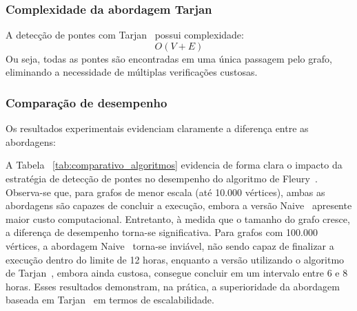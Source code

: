 \documentclass{sbc2023}%
\begin{document}
\subsubsection{Complexidade da abordagem Tarjan}

A detecção de pontes com Tarjan~\cite{tarjan1972dfs} possui complexidade:
$$O(V + E)$$
Ou seja, todas as pontes são encontradas em uma única passagem pelo grafo, eliminando a necessidade de múltiplas verificações custosas.

\subsubsection{Comparação de desempenho}

Os resultados experimentais evidenciam claramente a diferença entre as abordagens:

\begin{table}[H] %
\centering
\caption{Comparativo de Desempenho: Fleury Naive vs. Fleury + Tarjan}
\label{tab:comparativo_algoritmos}
\end{table}

A Tabela ~\ref{tab:comparativo_algoritmos} evidencia de forma clara o impacto da estratégia de detecção de pontes no desempenho do algoritmo de Fleury~\citep{AlgoFleury}. Observa-se que, para grafos de menor escala (até 10.000 vértices), ambas as abordagens são capazes de concluir a execução, embora a versão Naive~\cite{cormen2022Naive} apresente maior custo computacional. Entretanto, à medida que o tamanho do grafo cresce, a diferença de desempenho torna-se significativa. Para grafos com 100.000 vértices, a abordagem Naive~\cite{cormen2022Naive} torna-se inviável, não sendo capaz de finalizar a execução dentro do limite de 12 horas, enquanto a versão utilizando o algoritmo de Tarjan~\cite{tarjan1972dfs}, embora ainda custosa, consegue concluir em um intervalo entre 6 e 8 horas. Esses resultados demonstram, na prática, a superioridade da abordagem baseada em Tarjan~\cite{tarjan1972dfs} em termos de escalabilidade.
\end{document}
